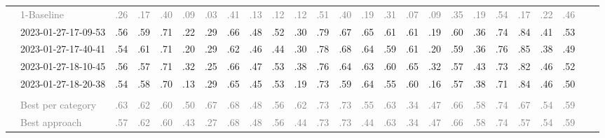 \begin{table*}
\begin{tabular}{@{}ll@{\hspace{10pt}}c@{\hspace{5pt}}cccccccccccccccccccccc@{}}
& \textcolor{gray}{1-Baseline} & \textcolor{gray}{.26} & \textcolor{gray}{.17} & \textcolor{gray}{.40} & \textcolor{gray}{.09} & \textcolor{gray}{.03} & \textcolor{gray}{.41} & \textcolor{gray}{.13} & \textcolor{gray}{.12} & \textcolor{gray}{.12} & \textcolor{gray}{.51} & \textcolor{gray}{.40} & \textcolor{gray}{.19} & \textcolor{gray}{.31} & \textcolor{gray}{.07} & \textcolor{gray}{.09} & \textcolor{gray}{.35} & \textcolor{gray}{.19} & \textcolor{gray}{.54} & \textcolor{gray}{.17} & \textcolor{gray}{.22} & \textcolor{gray}{.46} \\
& 2023-01-27-17-09-53 & .56 & .59 & .71 & .22 & .29 & .66 & .48 & .52 & .30 & .79 & .67 & .65 & .61 & .61 & .19 & .60 & .36 & .74 & .84 & .41 & .53 \\
& 2023-01-27-17-40-41 & .54 & .61 & .71 & .20 & .29 & .62 & .46 & .44 & .30 & .78 & .68 & .64 & .59 & .61 & .20 & .59 & .36 & .76 & .85 & .38 & .49 \\
& 2023-01-27-18-10-45 & .56 & .57 & .71 & .32 & .25 & .66 & .47 & .53 & .38 & .76 & .64 & .63 & .60 & .65 & .32 & .57 & .43 & .73 & .82 & .46 & .52 \\
& 2023-01-27-18-20-38 & .54 & .58 & .70 & .13 & .29 & .65 & .45 & .53 & .19 & .73 & .59 & .64 & .55 & .60 & .16 & .57 & .38 & .71 & .84 & .46 & .50 \\
\addlinespace
\multicolumn{2}{@{}l}{\emph{Nahj al-Balagha}} \\
& \textcolor{gray}{Best per category} & \textcolor{gray}{.63} & \textcolor{gray}{.62} & \textcolor{gray}{.60} & \textcolor{gray}{.50} & \textcolor{gray}{.67} & \textcolor{gray}{.68} & \textcolor{gray}{.48} & \textcolor{gray}{.56} & \textcolor{gray}{.62} & \textcolor{gray}{.73} & \textcolor{gray}{.73} & \textcolor{gray}{.55} & \textcolor{gray}{.63} & \textcolor{gray}{.34} & \textcolor{gray}{.47} & \textcolor{gray}{.66} & \textcolor{gray}{.58} & \textcolor{gray}{.74} & \textcolor{gray}{.67} & \textcolor{gray}{.54} & \textcolor{gray}{.59} \\
& \textcolor{gray}{Best approach} & \textcolor{gray}{.57} & \textcolor{gray}{.62} & \textcolor{gray}{.60} & \textcolor{gray}{.43} & \textcolor{gray}{.27} & \textcolor{gray}{.68} & \textcolor{gray}{.48} & \textcolor{gray}{.56} & \textcolor{gray}{.44} & \textcolor{gray}{.73} & \textcolor{gray}{.73} & \textcolor{gray}{.44} & \textcolor{gray}{.63} & \textcolor{gray}{.34} & \textcolor{gray}{.47} & \textcolor{gray}{.66} & \textcolor{gray}{.58} & \textcolor{gray}{.74} & \textcolor{gray}{.57} & \textcolor{gray}{.54} & \textcolor{gray}{.59} \\

\end{tabular}
\end{table*}
